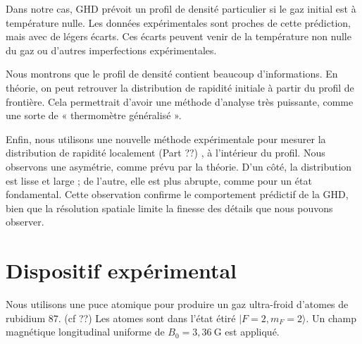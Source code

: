 Dans notre cas, GHD prévoit un profil de densité particulier si le gaz initial est à température nulle. Les données expérimentales sont proches de cette prédiction, mais avec de légers écarts. Ces écarts peuvent venir de la température non nulle du gaz ou d’autres imperfections expérimentales.

Nous montrons que le profil de densité contient beaucoup d’informations. En théorie, on peut retrouver la distribution de rapidité initiale à partir du profil de frontière. Cela permettrait d’avoir une méthode d’analyse très puissante, comme une sorte de « thermomètre généralisé ». %

Enfin, nous utilisons une nouvelle méthode expérimentale pour mesurer la distribution de rapidité localement (Part {??}) , à l’intérieur du profil. Nous observons une asymétrie, comme prévu par la théorie. D’un côté, la distribution est lisse et large ; de l’autre, elle est plus abrupte, comme pour un état fondamental. Cette observation confirme le comportement prédictif de la GHD, bien que la résolution spatiale limite la finesse des détails que nous pouvons observer.


\section{Dispositif expérimental}

Nous utilisons une puce atomique pour produire un gaz ultra-froid d’atomes de rubidium 87. (cf {??}) Les atomes sont dans l’état étiré $|F=2, m_F=2\rangle$. Un champ magnétique longitudinal uniforme de $B_0 = 3,36 ~\mathrm{G}$ est appliqué.



